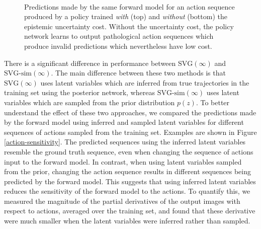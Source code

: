 \documentclass{article} %
\begin{document}
\begin{figure}[t!]
    \centering
     \\
    \caption{Predictions made by the same forward model for an action sequence produced by a policy trained \textit{with} (top) and \textit{without} (bottom) the epistemic uncertainty cost. Without the uncertainty cost, the policy network learns to output pathological action sequences which produce invalid predictions which nevertheless have low cost.}
    \label{svg-pred}
\end{figure}

There is a significant difference in performance between $\mbox{SVG}(\infty)$ and $\mbox{SVG-sim}(\infty)$.
The main difference between these two methods is that $\mbox{SVG}(\infty)$ uses latent variables which are inferred from true trajectories in the training set using the posterior network, whereas $\mbox{SVG-sim}(\infty)$ uses latent variables which are sampled from the prior distribution $p(z)$. To better understand the effect of these two approaches, we compared the predictions made by the forward model using inferred and sampled latent variables for different sequences of actions sampled from the training set. Examples are shown in Figure \ref{action-sensitivity}. The predicted sequences using the inferred latent variables resemble the ground truth sequence, even when changing the sequence of actions input to the forward model. In contrast, when using latent variables sampled from the prior, changing the action sequence results in different sequences being predicted by the forward model.
This suggests that using inferred latent variables reduces the sensitivity of the forward model to the actions.
To quantify this, we measured the magnitude of the partial derivatives of the output images with respect to actions, averaged over the training set, and found that these derivative were much smaller when the latent variables were inferred rather than sampled.
\end{document}
